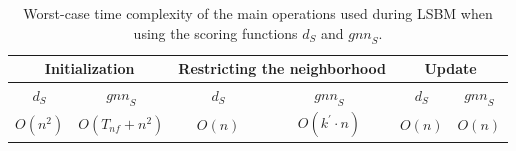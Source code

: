 \documentclass[draft,final]{vutinfth} %
\begin{document}
\begin{table}
    \centering
    \begin{tabular}{cc | cc | cc}
        \toprule
        \multicolumn{2}{c}{Initialization} & \multicolumn{2}{c}{Restricting the neighborhood} & \multicolumn{2}{c}{Update}  \\ \hline
        $d_S$ & $\mathit{gnn}_S$ & $d_S$ & $\mathit{gnn}_S$ & $d_S$ & $\mathit{gnn}_S$  \\ 
        $O(n^2)$ & $O(T_{nf} + n^2)$ & $O(n)$ & $O(k^\prime \cdot n)$ & $O(n)$ & $O(n)$ 
    \end{tabular}
    \caption{Worst-case time complexity of the main operations used during LSBM when using the scoring functions $d_S$ and $\mathit{gnn}_S$. }
    \label{tab:runtime-analysis}
\end{table}





\end{document}
